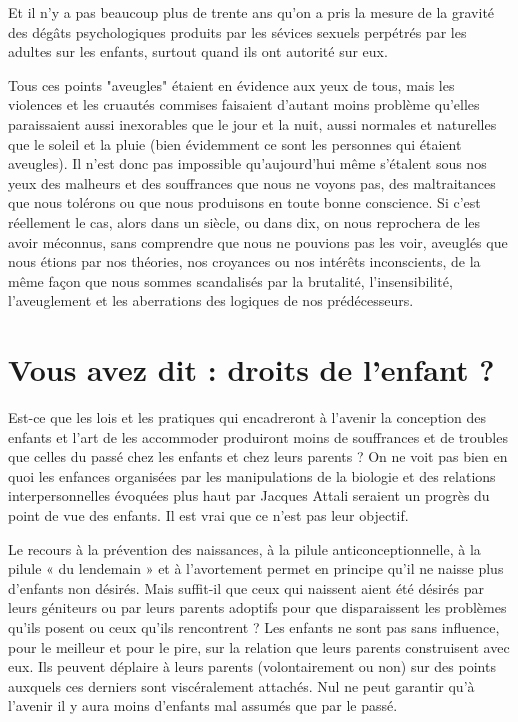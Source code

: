  Et il n'y a pas beaucoup plus de trente ans qu'on a pris la mesure de la gravité des dégâts psychologiques produits par les sévices sexuels perpétrés par les adultes sur les enfants, surtout quand ils ont autorité sur eux. 
 
 Tous ces points "aveugles" étaient en évidence aux yeux de tous, mais les violences et les cruautés commises faisaient d'autant moins problème qu'elles paraissaient aussi inexorables que le jour et la nuit, aussi normales et naturelles que le soleil et la pluie (bien évidemment ce sont les personnes qui étaient aveugles). Il n'est donc pas impossible qu'aujourd'hui même s'étalent sous nos yeux des malheurs et des souffrances que nous ne voyons pas, des maltraitances que nous tolérons ou que nous produisons en toute bonne conscience. Si c'est réellement le cas, alors dans un siècle, ou dans dix, on nous reprochera de les avoir méconnus, sans comprendre que nous ne pouvions pas les voir, aveuglés que nous étions par nos théories, nos croyances ou nos intérêts inconscients, de la même façon que nous sommes scandalisés par la brutalité, l'insensibilité, l'aveuglement et les aberrations des logiques de nos prédécesseurs. 

 
 
 \section{Vous avez dit : droits de l'enfant ?}
 
 Est-ce que les lois et les pratiques qui encadreront à l'avenir la conception des enfants et l'art de les accommoder produiront moins de souffrances et de troubles que celles du passé chez les enfants et chez leurs parents ? On ne voit pas bien en quoi les enfances organisées par les manipulations de la biologie et des relations interpersonnelles évoquées plus haut par Jacques Attali seraient un progrès du point de vue des enfants. Il est vrai que ce n'est pas leur objectif. 
 
 Le recours à la prévention des naissances, à la pilule anticonceptionnelle, à la pilule « du lendemain » et à l'avortement permet en principe qu'il ne naisse plus d'enfants non désirés. Mais suffit-il que ceux qui naissent aient été désirés par leurs géniteurs ou par leurs parents adoptifs pour que disparaissent les problèmes qu'ils posent ou ceux qu'ils rencontrent ? Les enfants ne sont pas sans influence, pour le meilleur et pour le pire, sur la relation que leurs parents construisent avec eux. Ils peuvent déplaire à leurs parents (volontairement ou non) sur des points auxquels ces derniers sont viscéralement attachés. Nul ne peut garantir qu'à l'avenir il y aura moins d'enfants mal assumés que par le passé.

